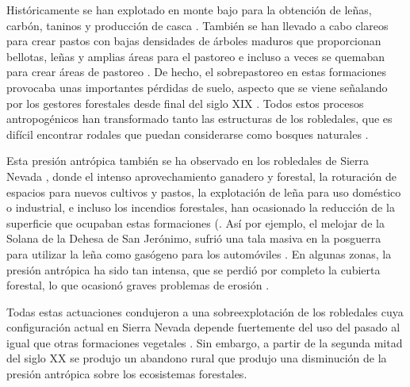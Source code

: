 Históricamente se han explotado en monte bajo para la obtención de leñas, carbón, taninos y producción de casca \autocite{RuizdelaTorre2006FloraMayor}. También se han llevado a cabo clareos para crear pastos con bajas densidades de árboles maduros que proporcionan bellotas, leñas y amplias áreas para el pastoreo e incluso a veces se quemaban para crear áreas de pastoreo \autocite{ValbuenaCarabanaGil2017CentenaryCoppicing}. De hecho, el sobrepastoreo en estas formaciones provocaba unas importantes pérdidas de suelo, aspecto que se viene señalando por los gestores forestales desde final del siglo XIX \autocite{Laguna1872ComisionFlora}. Todos estos procesos antropogénicos han transformado tanto las estructuras de los robledales, que es difícil encontrar rodales que puedan considerarse como bosques naturales \autocite{RuizdelaTorre2006FloraMayor}. 

Esta presión antrópica también se ha observado en los robledales de Sierra Nevada \autocite{JimenezOlivencia1991PaisajesSierra}, donde el intenso aprovechamiento ganadero y forestal, la roturación de espacios para nuevos cultivos y pastos, la explotación de leña para uso doméstico o industrial, e incluso los incendios forestales, han ocasionado la reducción de la superficie que ocupaban estas formaciones \autocite{CamachoOlmedoetal2002AltaAlpujarra} (. Así por ejemplo, el melojar de la Solana de la Dehesa de San Jerónimo, sufrió una tala masiva en la posguerra para utilizar la leña como gasógeno para los automóviles \autocite{Prieto1975BosquesSierra}. En algunas zonas, la presión antrópica ha sido tan intensa, que se perdió por completo la cubierta forestal, lo que ocasionó graves problemas de erosión \autocite{MesaGarrido2019ReforestacionSilvicultura,RomeroZurbano1909DivisionHidrologicoforestal}. 

Todas estas actuaciones condujeron a una sobreexplotación de los robledales cuya configuración actual en Sierra Nevada depende fuertemente del uso del pasado al igual que otras formaciones vegetales \autocite{NavarroGonzalezetal2013WeightLanduse}. Sin embargo, a partir de la segunda mitad del siglo XX se produjo un abandono rural que produjo una disminución de la presión antrópica sobre los ecosistemas forestales. 


